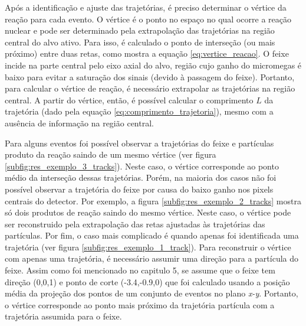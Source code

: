 \documentclass[a4paper,12pt,oneside]{book}
\begin{document}
\par Após a identificação e ajuste das trajetórias, é preciso determinar o vértice da reação para cada evento. O vértice é o ponto no espaço no qual ocorre a reação nuclear e pode ser determinado pela extrapolação das trajetórias na região central do alvo ativo. Para isso, é calculado o ponto de interseção (ou mais próximo) entre duas retas, como mostra a equação \ref{eq:vertice_reacao}. O feixe incide na parte central pelo eixo axial do alvo, região cujo ganho do micromegas é baixo para evitar a saturação dos sinais (devido à passagem do feixe). Portanto, para calcular o vértice de reação, é necessário extrapolar as trajetórias na região central. A partir do vértice, então, é possível calcular o comprimento $L$ da trajetória (dado pela equação \ref{eq:comprimento_trajetoria}), mesmo com a ausência de informação na região central.

\par Para alguns eventos foi possível observar a trajetórias do feixe e partículas produto da reação saindo de um mesmo vértice (ver figura \ref{subfig:res_exemplo_3_tracks}). Neste caso, o vértice corresponde ao ponto médio da interseção dessas trajetórias. Porém, na maioria dos casos não foi possível observar a trajetória do feixe por causa do baixo ganho nos pixels centrais do detector. Por exemplo, a figura \ref{subfig:res_exemplo_2_tracks} mostra só dois produtos de reação saindo do mesmo vértice. Neste caso, o vértice pode ser reconstruido pela extrapolação das retas ajustadas às trajetórias das partículas. Por fim, o caso mais complicado é quando apenas foi identificada uma trajetória (ver figura \ref{subfig:res_exemplo_1_track}). Para reconstruir o vértice com apenas uma trajetória, é necessário assumir uma direção para a partícula do feixe. Assim como foi mencionado no capitulo 5, se assume que o feixe tem direção (0,0,1) e ponto de corte (-3.4,-0.9,0) que foi calculado usando a posição média da projeção dos pontos de um conjunto de eventos no plano \textit{x-y}. Portanto, o vértice corresponde ao ponto mais próximo da trajetória partícula com a trajetória assumida para o feixe.
\end{document}
